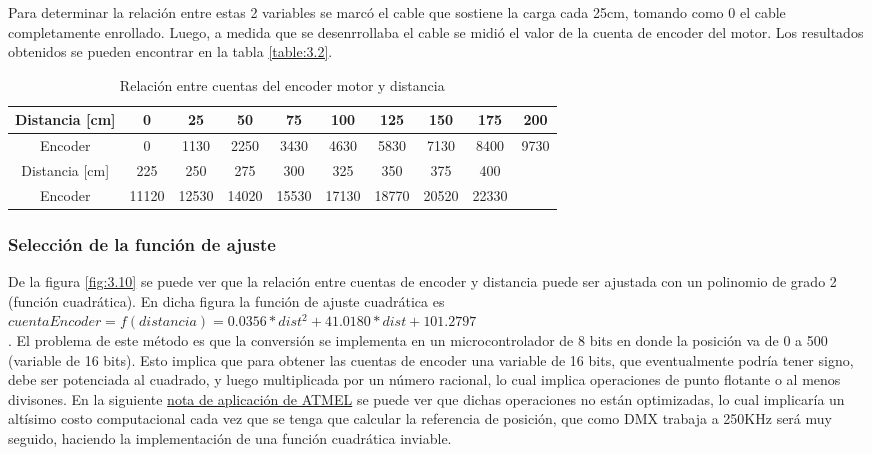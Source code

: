 Para determinar la relación entre estas 2 variables se marcó el cable que sostiene la carga cada 25cm, tomando como 0 el cable completamente enrollado. Luego, a medida que se desenrrollaba el cable se midió el valor de la cuenta de encoder del motor. Los resultados obtenidos se pueden encontrar en la tabla \ref{table:3.2}.

\begin{table}[!ht]
	\begin{center}
		
		\begin{tabular}{|c|c|c|c|c|c|c|c|c|c|}
			\hline
			\rowcolor{OODlightblue}
			Distancia [cm] & 0 & 25 & 50 & 75 & 100 & 125 & 150 & 175 & 200  \\
			\hline
			Encoder & 0 & 1130 & 2250 & 3430 & 4630 & 5830 & 7130 & 8400 & 9730 \\
			\hline \hline
			\rowcolor{OODlightblue}
			Distancia [cm]  & 225 & 250 & 275 & 300 & 325 & 350 & 375 & 400 & \\
			\hline
			Encoder  & 11120 & 12530 & 14020 & 15530 & 17130 & 18770 & 20520 & 22330 & \\ 
			\hline
		\end{tabular}
	\end{center}
	\caption{Relación entre cuentas del encoder motor y distancia}
	\label{table:\thetable}
\end{table}

\subsubsection{Selección de la función de ajuste}
De la figura \ref{fig:3.10} se puede ver que la relación entre cuentas de encoder y distancia puede ser ajustada con un polinomio de grado 2 (función cuadrática). En dicha figura la función de ajuste cuadrática es \(cuentaEncoder = f(distancia) = 0.0356*dist^2 + 41.0180*dist + 101.2797\)\\.     
El problema de este método es que la conversión se implementa en un microcontrolador de 8 bits en donde la posición va de 0 a 500 (variable de 16 bits). Esto implica que para obtener las cuentas de encoder una variable de 16 bits, que eventualmente podría tener signo, debe ser potenciada al cuadrado, y luego multiplicada por un número racional, lo cual implica operaciones de punto flotante o al menos divisones. En la siguiente \href{http://www.atmel.com/Images/doc0936.pdf}{nota de aplicación de ATMEL} se puede ver que dichas operaciones no están optimizadas, lo cual implicaría un altísimo costo computacional cada vez que se tenga que calcular la referencia de posición, que como DMX trabaja a 250KHz será muy seguido, haciendo la implementación de una función cuadrática inviable. \\

